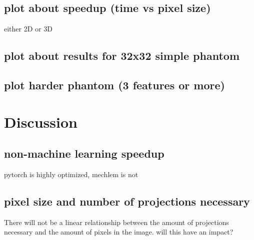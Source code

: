 \documentclass[9pt,Preprint]{lapreprint}
\begin{document}
\subsection{plot about speedup (time vs pixel size)}

either 2D or 3D

\subsection{plot about results for 32x32 simple phantom}

\subsection{plot harder phantom (3 features or more)}

\section{Discussion}

\subsection{non-machine learning speedup}

pytorch is highly optimized, mechlem is not

\subsection{pixel size and number of projections necessary}

There will not be a linear relationship between the amount of projections necessary and the amount of pixels in the image. will this have an impact?

\printbibliography

\if@endfloat\clearpage\processdelayedfloats\clearpage\fi



\end{document}
